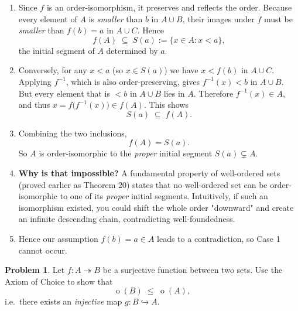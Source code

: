 \documentclass[12pt]{article}
\theoremstyle{definition} %
\newtheorem{problem}{Problem}
\theoremstyle{plain} %
\begin{document}
\begin{enumerate}
    \item Since \(f\) is an order-isomorphism, it preserves and reflects the order.  
          Because every element of $A$ is \emph{smaller} than $b$ in
          $A\cup B$, their images under $f$ must be \emph{smaller} than
          \(f(b)=a\) in $A\cup C$.  
          Hence
          \[
              f(A)\;\subseteq\;S(a)
              :=\{x\in A : x<a\},
          \]
          the initial segment of $A$ determined by $a$.

    \item Conversely, for any \(x<a\) (so \(x\in S(a)\)) we have
          \(x<f(b)\) in $A\cup C$.  
          Applying \(f^{-1}\), which is also order‑preserving,
          gives \(f^{-1}(x)<b\) in $A\cup B$.  
          But every element that is $<b$ in $A\cup B$ lies in $A$.
          Therefore \(f^{-1}(x)\in A\), and thus \(x=f\bigl(f^{-1}(x)\bigr)
          \in f(A)\).
          This shows
          \[
              S(a)\;\subseteq\;f(A).
          \]

    \item Combining the two inclusions,
          \[
              f(A)=S(a).
          \]
          So \(A\) is order-isomorphic to the \emph{proper} initial
          segment \(S(a)\subsetneq A\).

    \item \textbf{Why is that impossible?}  
          A fundamental property of well-ordered sets (proved earlier as
          Theorem 20) states that no well-ordered set can be order-isomorphic
          to one of its \emph{proper} initial segments.  
          Intuitively, if such an isomorphism existed, you could shift the
          whole order "downward" and create an infinite descending chain,
          contradicting well-foundedness.

    \item Hence our assumption \(f(b)=a\in A\) leads to a contradiction,
          so Case 1 cannot occur.
\end{enumerate}

\begin{problem}
    Let $f:A\twoheadrightarrow B$ be a surjective function between two sets.
    Use the Axiom of Choice to show that
    \[
        \operatorname{o}(B)\;\le\;\operatorname{o}(A),
    \]
    i.e.\ there exists an \emph{injective} map $g:B\hookrightarrow A$.
\end{problem}
\end{document}
